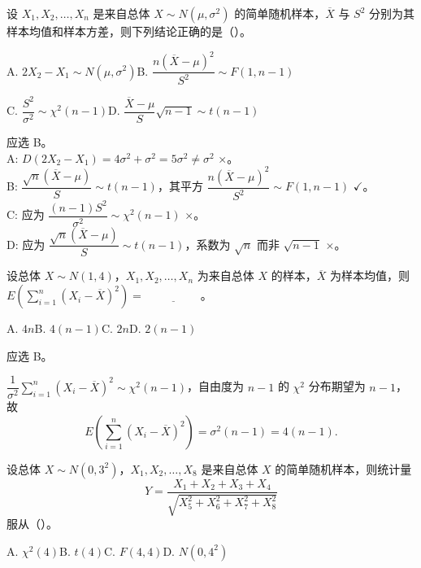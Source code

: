 \documentclass[lang=cn,11pt]{elegantbook}
\begin{document}
\begin{exercise}\label{exer:6-normal-judge}
设 \(X_1, X_2, \dots, X_n\) 是来自总体 \(X \sim N(\mu, \sigma^2)\) 的简单随机样本，\(\overline{X}\) 与 \(S^2\) 分别为其样本均值和样本方差，则下列结论正确的是（\quad）。\par
A. \(2X_2 - X_1 \sim N(\mu, \sigma^2)\)\quad B. \(\dfrac{n(\overline{X}-\mu)^2}{S^2} \sim F(1,n-1)\)\par
C. \(\dfrac{S^2}{\sigma^2} \sim \chi^2(n-1)\)\quad D. \(\dfrac{\overline{X}-\mu}{S}\sqrt{n-1} \sim t(n-1)\)
\end{exercise}
\begin{solution}
应选 B。\\
A: \(D(2X_2-X_1) = 4\sigma^2+\sigma^2 = 5\sigma^2 \neq \sigma^2\) \(\times\)。\\
B: \(\dfrac{\sqrt{n}(\overline{X}-\mu)}{S} \sim t(n-1)\)，其平方 \(\dfrac{n(\overline{X}-\mu)^2}{S^2} \sim F(1,n-1)\) \(\checkmark\)。\\
C: 应为 \(\dfrac{(n-1)S^2}{\sigma^2} \sim \chi^2(n-1)\) \(\times\)。\\
D: 应为 \(\dfrac{\sqrt{n}(\overline{X}-\mu)}{S} \sim t(n-1)\)，系数为 \(\sqrt{n}\) 而非 \(\sqrt{n-1}\) \(\times\)。
\end{solution}



\begin{exercise}\label{exer:6-esum-sq}
设总体 \(X \sim N(1, 4)\)，\(X_1, X_2, \dots, X_n\) 为来自总体 \(X\) 的样本，\(\overline{X}\) 为样本均值，则 \(E\!\left(\displaystyle\sum_{i=1}^{n}(X_i-\overline{X})^2\right) =\,\underline{\hspace{2cm}}\)。\par
A. \(4n\)\quad B. \(4(n-1)\)\quad C. \(2n\)\quad D. \(2(n-1)\)
\end{exercise}

\begin{solution}
应选 B。

\(\dfrac{1}{\sigma^2}\displaystyle\sum_{i=1}^{n}(X_i-\overline{X})^2 \sim \chi^2(n-1)\)，自由度为 \(n-1\) 的 \(\chi^2\) 分布期望为 \(n-1\)，故
\[
E\!\left(\sum_{i=1}^{n}(X_i-\overline{X})^2\right) = \sigma^2(n-1) = 4(n-1).
\]
\end{solution}

\begin{exercise}\label{exer:6-y-t-dist}
设总体 \(X \sim N(0, 3^2)\)，\(X_1, X_2, \dots, X_8\) 是来自总体 \(X\) 的简单随机样本，则统计量
\[
Y = \frac{X_1 + X_2 + X_3 + X_4}{\sqrt{X_5^2 + X_6^2 + X_7^2 + X_8^2}}
\]
服从（\quad）。\par
A. \(\chi^2(4)\)\quad B. \(t(4)\)\quad C. \(F(4,4)\)\quad D. \(N(0, 4^2)\)
\end{exercise}
\end{document}
